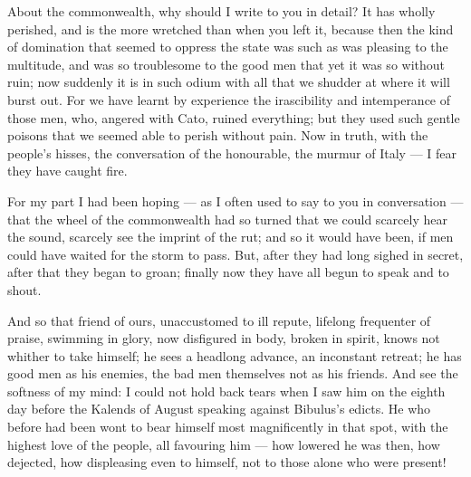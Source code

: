 

 About the commonwealth, why should I write to you in detail? It has wholly perished, and is the more wretched than when you left it, because then the kind of domination that seemed to oppress the state was such as was pleasing to the multitude, and was so troublesome to the good men that yet it was so without ruin; now suddenly it is in such odium with all that we shudder at where it will burst out. For we have learnt by experience the irascibility and intemperance of those men, who, angered with Cato, ruined everything; but they used such gentle poisons that we seemed able to perish without pain. Now in truth, with the people's hisses, the conversation of the honourable, the murmur of Italy --- I fear they have caught fire.

 For my part I had been hoping --- as I often used to say to you in conversation --- that the wheel of the commonwealth had so turned that we could scarcely hear the sound, scarcely see the imprint of the rut; and so it would have been, if men could have waited for the storm to pass. But, after they had long sighed in secret, after that they began to groan; finally now they have all begun to speak and to shout.

 And so that friend of ours, unaccustomed to ill repute, lifelong frequenter of praise, swimming in glory, now disfigured in body, broken in spirit, knows not whither to take himself; he sees a headlong advance, an inconstant retreat; he has good men as his enemies, the bad men themselves not as his friends. And see the softness of my mind: I could not hold back tears when I saw him on the eighth day before the Kalends of August speaking against Bibulus's edicts. He who before had been wont to bear himself most magnificently in that spot, with the highest love of the people, all favouring him --- how lowered he was then, how dejected, how displeasing even to himself, not to those alone who were present!

